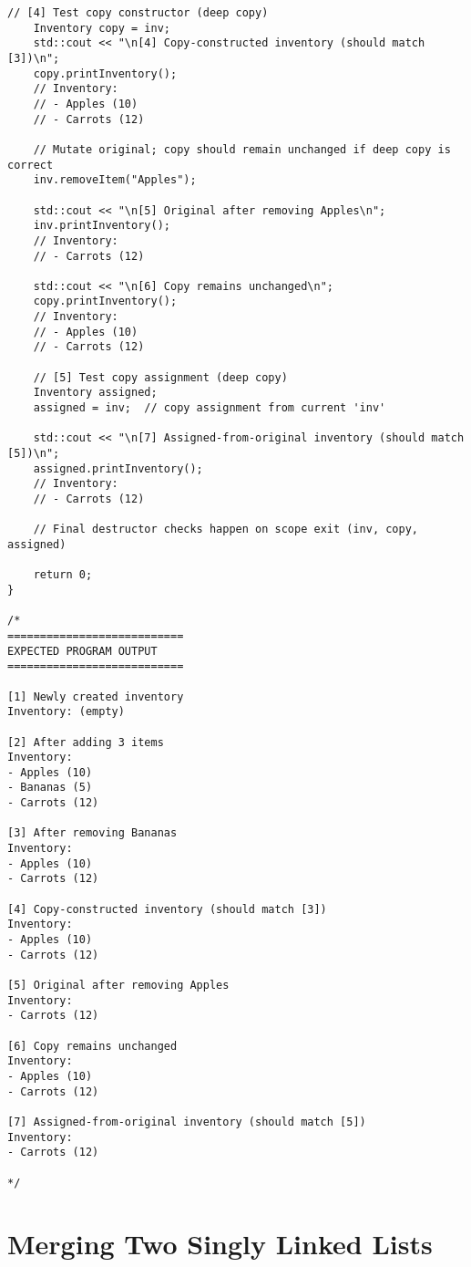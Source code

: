 \documentclass{article}
\begin{document}
\begin{lstlisting}[style=cppstyle]
    // [4] Test copy constructor (deep copy)
    Inventory copy = inv;
    std::cout << "\n[4] Copy-constructed inventory (should match [3])\n";
    copy.printInventory();
    // Inventory:
    // - Apples (10)
    // - Carrots (12)

    // Mutate original; copy should remain unchanged if deep copy is correct
    inv.removeItem("Apples");

    std::cout << "\n[5] Original after removing Apples\n";
    inv.printInventory();
    // Inventory:
    // - Carrots (12)

    std::cout << "\n[6] Copy remains unchanged\n";
    copy.printInventory();
    // Inventory:
    // - Apples (10)
    // - Carrots (12)

    // [5] Test copy assignment (deep copy)
    Inventory assigned;
    assigned = inv;  // copy assignment from current 'inv'

    std::cout << "\n[7] Assigned-from-original inventory (should match [5])\n";
    assigned.printInventory();
    // Inventory:
    // - Carrots (12)

    // Final destructor checks happen on scope exit (inv, copy, assigned)

    return 0;
}

/*
===========================
EXPECTED PROGRAM OUTPUT
===========================

[1] Newly created inventory
Inventory: (empty)

[2] After adding 3 items
Inventory:
- Apples (10)
- Bananas (5)
- Carrots (12)

[3] After removing Bananas
Inventory:
- Apples (10)
- Carrots (12)

[4] Copy-constructed inventory (should match [3])
Inventory:
- Apples (10)
- Carrots (12)

[5] Original after removing Apples
Inventory:
- Carrots (12)

[6] Copy remains unchanged
Inventory:
- Apples (10)
- Carrots (12)

[7] Assigned-from-original inventory (should match [5])
Inventory:
- Carrots (12)

*/

\end{lstlisting}

\section{Merging Two Singly Linked Lists}
\end{document}
